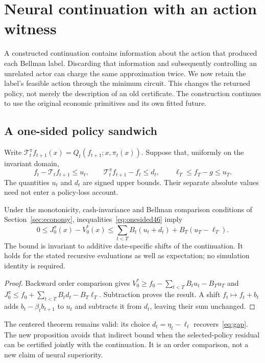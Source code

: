 \section{Neural continuation with an action witness}\label{sec:witness46}
A constructed continuation contains information about the action that produced each Bellman label. Discarding that information and subsequently controlling an unrelated actor can charge the same approximation twice. We now retain the label's feasible action through the minimum circuit. This changes the returned policy, not merely the description of an old certificate. The construction continues to use the original economic primitives and its own fitted future.

\subsection{A one-sided policy sandwich}
Write $\mathcal T_t^\pi f_{t+1}(x)=Q_t(f_{t+1};x,\pi_t(x))$. Suppose that, uniformly on the invariant domain,
\begin{equation}\label{eq:onesided46}
 f_t-\mathcal T_tf_{t+1}\le u_t,\qquad
 \mathcal T_t^\pi f_{t+1}-f_t\le d_t,
 \qquad \ell_T\le f_T-g\le u_T.
\end{equation}
The quantities $u_t$ and $d_t$ are signed upper bounds. Their separate absolute values need not enter a policy-loss account.

\begin{proposition}\label{prop:onesided46}
Under the monotonicity, cash-invariance and Bellman comparison conditions of Section~\ref{sec:economy}, inequalities~\eqref{eq:onesided46} imply
\begin{equation}\label{eq:jointgap46}
 0\le J_0^\pi(x)-V_0^*(x)
 \le \sum_{t<T}B_t(u_t+d_t)+B_T(u_T-\ell_T).
\end{equation}
The bound is invariant to additive date-specific shifts of the continuation. It holds for the stated recursive evaluations as well as expectation; no simulation identity is required.
\end{proposition}
\begin{proof}
Backward order comparison gives $V_0^*\ge f_0-\sum_{t<T}B_tu_t-B_Tu_T$ and $J_0^\pi\le f_0+\sum_{t<T}B_td_t-B_T\ell_T$. Subtraction proves the result. A shift $f_t\mapsto f_t+b_t$ adds $b_t-\beta_tb_{t+1}$ to $u_t$ and subtracts it from $d_t$, leaving their sum unchanged.
\end{proof}
The centered theorem remains valid: its choice $d_t=\eta_t-\ell_t$ recovers~\eqref{eq:gap}. The new proposition avoids that indirect bound when the selected-policy residual can be certified jointly with the continuation. It is an order comparison, not a new claim of neural superiority.

